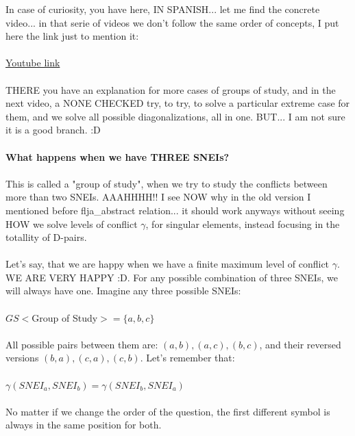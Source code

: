 		\noindent
		In case of curiosity, you have here, IN SPANISH... let me find the concrete video... in that serie of videos we don't follow the same order of concepts, I put here the link just to mention it:\\\\
		\href{https://www.youtube.com/watch?v=bmATMa0UF2E&list=PLcEv5UNDUdw68yFXf2kYGDZVyIGpCfGdy&index=5}{Youtube link} \\\\
		THERE you have an explanation for more cases of groups of study, and in the next video, a NONE CHECKED try, to try, to solve a particular extreme case for them, and we solve all possible diagonalizations, all in one. BUT... I am not sure it is a good branch. :D
		\\\\
		
		\noindent
		\textbf{What happens when we have THREE SNEIs?}
		\\\\
		
		\noindent
		This is called a "group of study", when we try to study the conflicts between more than two SNEIs. AAAHHHH!! I see NOW why in the old version I mentioned before flja\_abstract relation... it should work anyways without seeing HOW we solve levels of conflict $\gamma$, for singular elements, instead focusing in the totallity of D-pairs.
		\\\\
		
		\noindent
		Let's say, that we are happy when we have a finite maximum level of conflict $\gamma$. WE ARE VERY HAPPY :D. For any possible combination of three SNEIs, we will always have one. Imagine any three possible SNEIs:\\\\
		$ GS<$Group of Study$>= \{a,b,c\}$\\\\
		All possible pairs between them are: $(a,b), (a,c), (b,c)$, and their reversed versions $(b,a),(c,a),(c,b)$. Let's remember that:\\\\
		$\gamma(SNEI_{a}, SNEI_{b}) = \gamma(SNEI_{b}, SNEI_{a})$\\\\
		No matter if we change the order of the question, the first different symbol is always in the same position for both.
		\\\\
		
